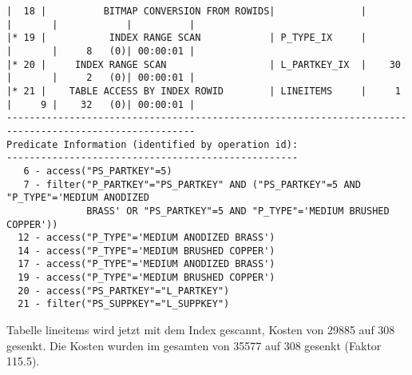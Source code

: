 \documentclass[10pt]{article}
\begin{document}
\begin{lstlisting}[style=queryexecutionplan]
|  18 |          BITMAP CONVERSION FROM ROWIDS|               |       |       |            |          |
|* 19 |           INDEX RANGE SCAN            | P_TYPE_IX     |       |       |     8   (0)| 00:00:01 |
|* 20 |     INDEX RANGE SCAN                  | L_PARTKEY_IX  |    30 |       |     2   (0)| 00:00:01 |
|* 21 |    TABLE ACCESS BY INDEX ROWID        | LINEITEMS     |     1 |     9 |    32   (0)| 00:00:01 |
-------------------------------------------------------------------------------------------------------
Predicate Information (identified by operation id):
---------------------------------------------------
   6 - access("PS_PARTKEY"=5)
   7 - filter("P_PARTKEY"="PS_PARTKEY" AND ("PS_PARTKEY"=5 AND "P_TYPE"='MEDIUM ANODIZED 
              BRASS' OR "PS_PARTKEY"=5 AND "P_TYPE"='MEDIUM BRUSHED COPPER'))
  12 - access("P_TYPE"='MEDIUM ANODIZED BRASS')
  14 - access("P_TYPE"='MEDIUM BRUSHED COPPER')
  17 - access("P_TYPE"='MEDIUM ANODIZED BRASS')
  19 - access("P_TYPE"='MEDIUM BRUSHED COPPER')
  20 - access("PS_PARTKEY"="L_PARTKEY")
  21 - filter("PS_SUPPKEY"="L_SUPPKEY")
\end{lstlisting}

Tabelle lineitems wird jetzt mit dem Index gescannt, Kosten von 29885 auf 308 gesenkt. Die Kosten wurden im gesamten von 35577 auf 308 gesenkt (Faktor 115.5).
\end{document}
